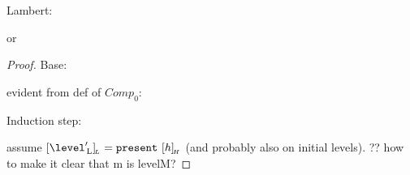 Lambert:












or



\begin{proof}
Base:


evident from def of $Comp_0$:




%

Induction step:

assume $\eqcl{\level'\L}{L} = \present~\eqcl{h}{H}$ (and probably also  on initial levels). ?? how to make it clear that m is levelM?


%



\end{proof}

